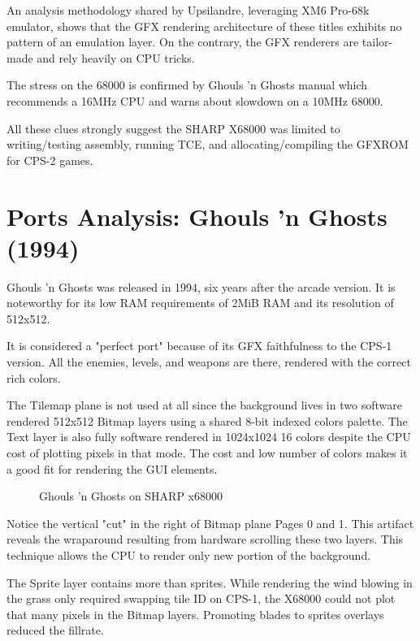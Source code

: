 An analysis methodology shared by Upsilandre\cite{x68k_games_analysis}, leveraging XM6 Pro-68k emulator, shows that the GFX rendering architecture of these titles exhibits no pattern of an emulation layer. On the contrary, the GFX renderers are tailor-made and rely heavily on CPU tricks. 

\begin{trivia}
The stress on the 68000 is confirmed by Ghouls 'n Ghosts manual which recommends a 16MHz CPU and warns about slowdown on a 10MHz 68000.
\end{trivia}

All these clues strongly suggest the SHARP X68000 was limited to writing/testing assembly, running TCE, and allocating/compiling the GFXROM for CPS-2 games.



\section{Ports Analysis: Ghouls 'n Ghosts (1994)}
Ghouls 'n Ghosts was released in 1994, six years after the arcade version. It is noteworthy for its low RAM requirements of 2MiB RAM and its resolution of 512x512.

It is considered a "perfect port" because of its GFX faithfulness to the CPS-1 version. All the enemies, levels, and weapons are there, rendered with the correct rich colors. 

The Tilemap plane is not used at all since the background lives in two software rendered 512x512 Bitmap layers using a shared 8-bit indexed colors palette. The Text layer is also fully software rendered in 1024x1024 16 colors despite the CPU cost of plotting pixels in that mode. The cost and low number of colors makes it a good fit for rendering the GUI elements.

\begin{figure}[H]
\caption*{Ghouls 'n Ghosts on SHARP x68000}
\end{figure}


Notice the vertical "cut" in the right of Bitmap plane Pages 0 and 1. This artifact reveals the wraparound resulting from hardware scrolling these two layers. This technique allows the CPU to render only new portion of the background. 

The Sprite layer contains more than sprites. While rendering the wind blowing in the grass only required swapping tile ID on CPS-1, the X68000 could not plot that many pixels in the Bitmap layers. Promoting blades to sprites overlays reduced the fillrate.

